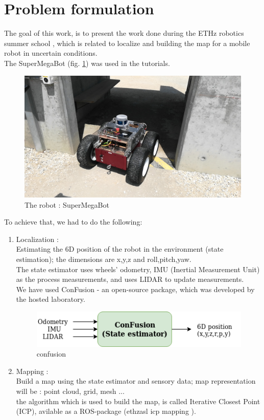 \documentclass[a4paper,12pt]{article}
\begin{document}
\newpage
\section{Problem formulation}
The goal of this work, is to present the work done during the ETHz robotics summer school \cite{1}, which is related to localize and building the map for a mobile robot in uncertain conditions.\\
The SuperMegaBot (fig. \ref{fig:smb}) was used in the tutorials.
\begin{figure}[H]
    \centering
    \includegraphics[width=\textwidth]{img/smb.jpg}
    \caption{The robot : SuperMegaBot}
    \label{fig:smb}
\end{figure}
To achieve that, we had to do the following:
\begin{enumerate}
\item Localization : \\
    Estimating the 6D position of the robot in the environment (state estimation); the dimensions are x,y,z and roll,pitch,yaw.\\
    The state estimator uses wheels' odometry, IMU (Inertial Measurement Unit) as the process measurements, and uses LIDAR to update measurements.\\
    We have used ConFusion \cite{2}- an open-source package, which was developed by the hosted laboratory.\\
    \begin{figure}[H]
    \centering
    \includegraphics[width=\textwidth]{img/confusion.png}
    \caption{confusion}
    \label{fig:confusion}
    \end{figure}
\item Mapping :\\
    Build a map using the state estimator and sensory data; map representation will be : point cloud, grid, mesh ...\\
    the algorithm which is used to build the map, is called Iterative Closest Point (ICP), avilable as a ROS-package (ethzasl icp mapping \cite{3}).
\end{enumerate}
\end{document}

